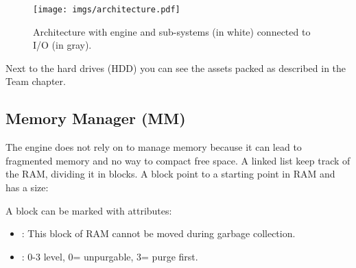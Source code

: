 \documentclass[book.tex]{subfiles}
\begin{document}
\begin{figure}[H]
\centering
\texttt{[image: imgs/architecture.pdf]}
\caption{Architecture with engine and sub-systems (in white) connected to I/O (in gray).}
\label{fig:architecture}
\end{figure}
Next to the hard drives (HDD) you can see the assets packed as described in the Team chapter.










\subsection{Memory Manager (MM)}
The engine does not rely on  to manage memory because it can lead to fragmented memory and no way to compact free space. A linked list keep track of the RAM, dividing it in blocks. A block
point to a starting point in RAM and has a size:\\
 \par

 \par
A block can be marked with attributes:
\begin{itemize}
\item {} : This block of RAM cannot be moved during garbage collection.
\item {} : 0-3 level, 0= unpurgable, 3= purge first.
\end{itemize}
\end{document}
